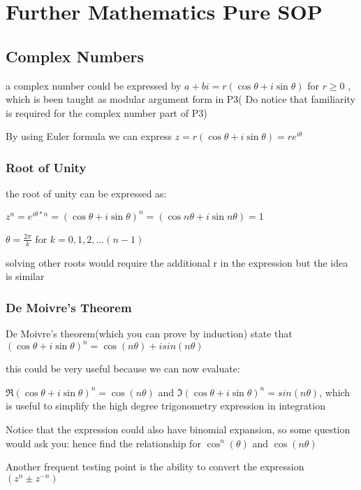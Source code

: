 \documentclass[]{article}
\date{}
\begin{document}
\section{Further Mathematics Pure SOP}\label{header-n845}

\subsection{Complex Numbers}\label{header-n847}

a complex number could be expressed by
\(a +bi = r(\cos\theta + i\sin\theta)\) for \(r \geq 0\) , which is been
taught as modular argument form in P3( Do notice that familiarity is
required for the complex number part of P3)

By using Euler formula we can express
\(z = r(\cos\theta + i\sin \theta) = re^{i\theta}\)

\subsubsection{Root of Unity}\label{header-n852}

the root of unity can be expressed as:

\(z^n =e^{i\theta*n} =(\cos\theta + i\sin\theta)^n = (\cos n\theta + i\sin n\theta)= 1\)

\(\theta = \frac{2\pi}{k}\) for \( k=0,1,2,...(n-1)\)

solving other roots would require the additional r in the expression but
the idea is similar

\subsubsection{De Moivre's Theorem}\label{header-n861}

De Moivre's theorem(which you can prove by induction) state that
\((\cos\theta + i\sin\theta)^n = \cos(n\theta) + isin(n\theta)\)

this could be very useful because we can now evaluate:

\(\Re {(\cos\theta+ i\sin\theta)^n} = \cos(n\theta)\) and
\(\Im{(\cos\theta + i\sin\theta)^n} = sin(n\theta)\), which is useful to
simplify the high degree trigonometry expression in integration

Notice that the expression could also have binomial expansion, so some
question would ask you: hence find the relationship for
\(\cos^n(\theta)\) and \(\cos(n\theta)\)

Another frequent testing point is the ability to convert the expression
\((z^n \pm z^{-n})\)
\end{document}
